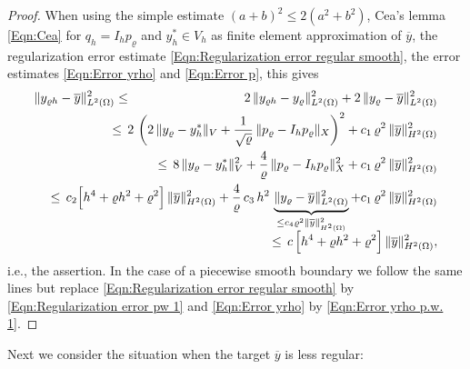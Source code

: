 \documentclass{article}
\numberwithin{equation}{section}
\begin{document}
\begin{proof}
  When using the simple estimate $(a+b)^2 \leq 2(a^2+b^2)$,
  Cea's lemma \eqref{Eqn:Cea} for $q_h = I_h p_\varrho$ and
  $y_h^* \in V_h$ as finite element approximation of $\overline{y}$,
  the regularization error estimate
  \eqref{Eqn:Regularization error regular smooth},
  the error estimates \eqref{Eqn:Error yrho} and \eqref{Eqn:Error p},
  this gives
  \begin{eqnarray*}
    \| y_{\varrho h} - \overline{y} \|^2_{L^2(\Omega)}
    & \leq & 2 \, \| y_{\varrho h} - y_\varrho \|_{L^2(\Omega)}^2 +
             2 \, \| y_\varrho - \overline{y} \|_{L^2(\Omega)}^2 \\
    && \hspace*{-2.5cm} \leq \, 2 \, \left( 2 \, \| y_\varrho - y_h^* \|_V +
             \frac{1}{\sqrt{\varrho}} \,
             \| p_\varrho - I_h p_\varrho \|_X \right)^2
             + c_1 \, \varrho^2 \, \| \overline{y} \|^2_{H^2(\Omega)} \\
    && \hspace*{-2.5cm}
       \leq \, 8 \, \| y_\varrho - y_h^* \|^2_V +
             \frac{4}{\varrho} \,
             \| p_\varrho - I_h p_\varrho \|_X^2 
             + c_1 \, \varrho^2 \, \| \overline{y} \|^2_{H^2(\Omega)} \\
    && \hspace*{-2.5cm}
       \leq \, c_2 \Big[ h^4 + \varrho h^2 + \varrho^2 \Big]
             \, \| \overline{y} \|^2_{H^2(\Omega)} +
             \frac{4}{\varrho} \, c_3 \, h^2 \,
             \underbrace{\| y_\varrho - \overline{y} \|_{L^2(\Omega)}^2
             }_{\leq c_4 \varrho^2 \| \overline{y} \|_{H^2(\Omega)}^2}
             + c_1 \, \varrho^2 \,
             \| \overline{y} \|^2_{H^2(\Omega)} \\[-2mm]
    && \hspace*{-2.5cm}
       \leq \, c \, \Big[ h^4 + \varrho h^2 + \varrho^2 \Big] \,
             \| \overline{y} \|^2_{H^2(\Omega)},
  \end{eqnarray*}
  i.e., the assertion. In the case of a piecewise smooth boundary we follow
  the same lines but replace \eqref{Eqn:Regularization error regular smooth}
  by \eqref{Eqn:Regularization error pw 1} and \eqref{Eqn:Error yrho} by
  \eqref{Eqn:Error yrho p.w. 1}.
\end{proof}

\noindent
Next we consider the situation when the target $\overline{y}$ is less regular:
\end{document}
